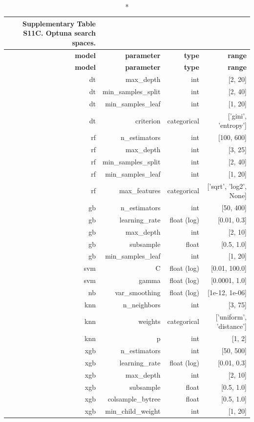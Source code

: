 \documentclass[10pt]{article}
\begin{document}
\tiny
\setlength{\tabcolsep}{2pt}
\begin{longtable}{rrrr}
\caption*{\textbf{Supplementary Table S11C.} Optuna search spaces.}\\
\toprule
\textbf{model} & \textbf{parameter} & \textbf{type} & \textbf{range} \\
\midrule
\endfirsthead
\toprule
\textbf{model} & \textbf{parameter} & \textbf{type} & \textbf{range} \\
\midrule
\endhead
\bottomrule
\endfoot
dt & max\_depth & int & [2, 20] \\
dt & min\_samples\_split & int & [2, 40] \\
dt & min\_samples\_leaf & int & [1, 20] \\
dt & criterion & categorical & ['gini', 'entropy'] \\
rf & n\_estimators & int & [100, 600] \\
rf & max\_depth & int & [3, 25] \\
rf & min\_samples\_split & int & [2, 40] \\
rf & min\_samples\_leaf & int & [1, 20] \\
rf & max\_features & categorical & ['sqrt', 'log2', None] \\
gb & n\_estimators & int & [50, 400] \\
gb & learning\_rate & float (log) & [0.01, 0.3] \\
gb & max\_depth & int & [2, 10] \\
gb & subsample & float & [0.5, 1.0] \\
gb & min\_samples\_leaf & int & [1, 20] \\
svm & C & float (log) & [0.01, 100.0] \\
svm & gamma & float (log) & [0.0001, 1.0] \\
nb & var\_smoothing & float (log) & [1e-12, 1e-06] \\
knn & n\_neighbors & int & [3, 75] \\
knn & weights & categorical & ['uniform', 'distance'] \\
knn & p & int & [1, 2] \\
xgb & n\_estimators & int & [50, 500] \\
xgb & learning\_rate & float (log) & [0.01, 0.3] \\
xgb & max\_depth & int & [2, 10] \\
xgb & subsample & float & [0.5, 1.0] \\
xgb & colsample\_bytree & float & [0.5, 1.0] \\
xgb & min\_child\_weight & int & [1, 20] \\
\bottomrule
\end{longtable}
\normalsize
\end{document}
